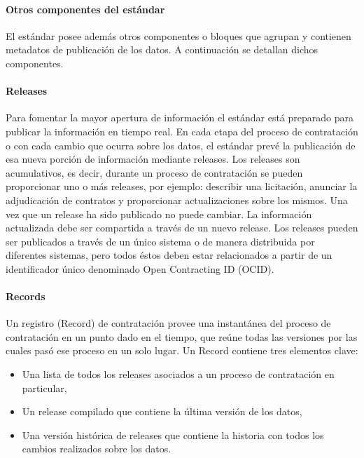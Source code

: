 \paragraph{Otros componentes del estándar}

El estándar posee además otros componentes o bloques que agrupan y contienen metadatos de publicación de los datos.  A continuación se detallan dichos componentes.

\paragraph{Releases}
Para fomentar la mayor apertura de información el estándar está preparado para publicar la información en tiempo real. En cada etapa del proceso de contratación o con cada cambio que ocurra sobre los datos, el estándar prevé la publicación de esa nueva porción de información mediante releases.
Los releases son acumulativos, es decir, durante un proceso de contratación se pueden proporcionar uno o más releases, por ejemplo: describir una licitación, anunciar la adjudicación de contratos y proporcionar actualizaciones sobre los mismos.
Una vez que un release ha sido publicado no puede cambiar. La información actualizada debe ser compartida a través de un nuevo release.
Los releases pueden ser publicados a través de un único sistema o de manera distribuida por diferentes sistemas, pero todos éstos deben estar relacionados a partir de un identificador único denominado Open Contracting ID (OCID).

\paragraph{Records}

Un registro (Record) de contratación provee una instantánea del proceso de contratación en un punto dado en el tiempo, que reúne todas las versiones por las cuales pasó ese proceso en un solo lugar.
Un Record contiene tres elementos clave: 
\begin{itemize}
    \item Una lista de todos los releases asociados a un proceso de contratación en particular, 
    \item Un release compilado que contiene la última versión de los datos,
    \item Una versión histórica de releases que contiene la historia con todos los cambios realizados sobre los datos.
 

    
\end{itemize}


